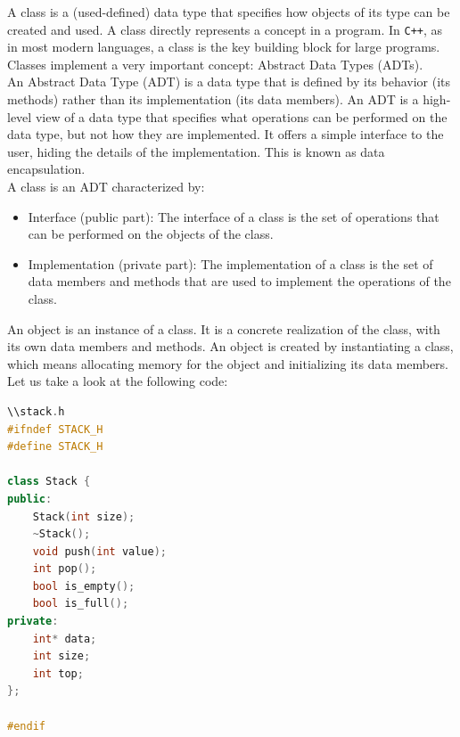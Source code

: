 A class is a (used-defined) data type that specifies how objects of its type can be created and used. A class directly 
represents a concept in a program. In \texttt{C++}, as in most modern languages, a class is the key building block for
large programs. Classes implement a very important concept: Abstract Data Types (ADTs).\\

An Abstract Data Type (ADT) is a data type that is defined by its behavior (its methods) rather than its implementation
(its data members). An ADT is a high-level view of a data type that specifies what operations can be performed on the data
type, but not how they are implemented. It offers a simple interface to the user, hiding the details of the implementation.
This is known as data encapsulation.\\

A class is an ADT characterized by:

\begin{itemize}
    \item Interface (public part): The interface of a class is the set of operations that can be performed on the objects 
    of the class.
    \item Implementation (private part): The implementation of a class is the set of data members and methods that are used 
    to implement the operations of the class.
\end{itemize}

An object is an instance of a class. It is a concrete realization of the class, with its own data members and methods. An
object is created by instantiating a class, which means allocating memory for the object and initializing its data members.\\

Let us take a look at the following code:

\begin{lstlisting}[language=C++]
\\stack.h
#ifndef STACK_H
#define STACK_H

class Stack {
public:
    Stack(int size);
    ~Stack();
    void push(int value);
    int pop();
    bool is_empty();
    bool is_full();
private:
    int* data;
    int size;
    int top;
};

#endif
\end{lstlisting}

